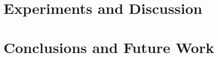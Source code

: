 \documentclass[10pt,twocolumn,letterpaper]{article}
\begin{document}
\section{Experiments and Discussion}

\section{Conclusions and Future Work}


{\small


}
\end{document}
